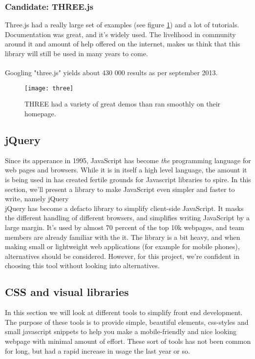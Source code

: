 \documentclass{report}
\begin{document}
\subsubsection{Candidate: THREE.js}
Three.js\cite{website:three} had a really large set of examples (see figure \ref{fig:three.js}) and a lot of tutorials. Documentation was great, and it’s widely used. The livelihood in community around it and amount of help offered on the internet, makes us think that this library will still be used in many years to come.\\ \\ 
Googling "three.js" yields about 430 000 results as per september 2013.

\begin{figure}
    \centering
    \texttt{[image: three]}
    \caption{THREE had a variety of great demos than ran smoothly on their homepage.}
    \label{fig:three.js}
\end{figure}

\newpage
\subsection{jQuery}

Since its apperance in 1995\cite{website:javascript_history}, JavaScript has become \emph{the} programming language for web pages and browsers\cite{website:javascript}. While it is in itself a high level language, the amount it is being used in has created fertile grounds for Javascript libraries to spire.
In this section, we'll present a library to make JavaScript even simpler and faster to write, namely jQuery\\

jQuery\cite{website:jquery} has become a defacto library to simplify client-side JavaScript. It masks the different handling of different browsers, and simplifies writing JavaScript by a large margin. It’s used by almost 70 percent of the top 10k webpages\cite{website:builtwith_jquery}, and team members are already familiar with the it. The library is a bit heavy, and when making small or lightweight web applications (for example for mobile phones), alternatives should be considered. However, for this project, we’re confident in choosing this tool without looking into alternatives.

\subsection{CSS and visual libraries}
In this section we will look at different tools to simplify front end development. The purpose of these tools is to provide simple, beautiful elements, css-styles and small javascript snippets to help you make a mobile-friendly and nice looking webpage with minimal amount of effort. These sort of tools has not been common for long, but had a rapid increase in usage the last year or so. 
\end{document}
